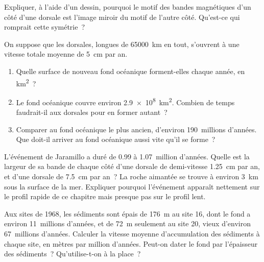 \begin{exercise}[$\star\star$]\label{exo:g11:drift-to-spreading:11}
Expliquer, à l'aide d'un dessin, pourquoi le motif des bandes magnétiques
d'un côté d'une dorsale est l'image miroir du motif de l'autre côté.
Qu'est-ce qui romprait cette symétrie~?
\end{exercise}

\begin{exercise}[$\star\star\star$]\label{exo:g11:drift-to-spreading:12}
On suppose que les dorsales, longues de \qty{65000}{km} en tout, s'ouvrent
à une vitesse totale moyenne de \qty{5}{cm} par an.
\begin{enumerate}
  \item Quelle surface de nouveau fond océanique forment-elles chaque
        année, en \unit{km^2}~?
  \item Le fond océanique couvre environ \qty{2.9e8}{km^2}. Combien de
        temps faudrait-il aux dorsales pour en former autant~?
  \item Comparer au fond océanique le plus ancien, d'environ
        \num{190}~millions d'années. Que doit-il arriver au fond océanique
        aussi vite qu'il se forme~?
\end{enumerate}
\end{exercise}

\begin{exercise}[$\star\star\star$]\label{exo:g11:drift-to-spreading:13}
L'événement de Jaramillo a duré de \num{0.99} à \num{1.07}~million
d'années. Quelle est la largeur de sa bande de chaque côté d'une dorsale de
demi-vitesse \qty{1.25}{cm} par an, et d'une dorsale de \qty{7.5}{cm} par
an~? La roche aimantée se trouve à environ \qty{3}{km} sous la surface de
la mer. Expliquer pourquoi l'événement apparaît nettement sur le profil
rapide de ce chapitre mais presque pas sur le profil lent.
\end{exercise}

\begin{exercise}[$\star\star\star$]\label{exo:g11:drift-to-spreading:14}
Aux sites de 1968, les sédiments sont épais de \qty{176}{m} au site 16,
dont le fond a environ \num{11}~millions d'années, et de \qty{72}{m}
seulement au site 20, vieux d'environ \num{67}~millions d'années. Calculer
la vitesse moyenne d'accumulation des sédiments à chaque site, en mètres par
million d'années. Peut-on dater le fond par l'épaisseur des sédiments~?
Qu'utilise-t-on à la place~?
\end{exercise}

